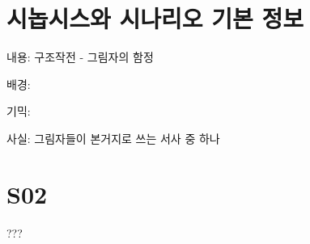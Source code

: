 \documentclass{report}
\begin{document}
	\section{시놉시스와 시나리오 기본 정보}
		내용: 구조작전 - 그림자의 함정
		
		배경: 
		
		기믹: 
		
		사실: 그림자들이 본거지로 쓰는 서사 중 하나
		
	
	\section{S02}
		???
\end{document}
